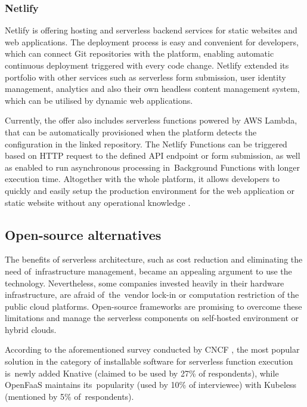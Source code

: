 \subsubsection{Netlify}

Netlify is offering hosting and serverless backend services for static websites and web applications. The deployment process is easy and convenient for developers, which can connect Git repositories with the platform, enabling automatic continuous deployment triggered with every code change. Netlify extended its portfolio with other services such as serverless form submission, user identity management, analytics and also their own headless content management system, which can be utilised by dynamic web applications.

Currently, the offer also includes serverless functions powered by AWS Lambda, that can be automatically provisioned when the platform detects the configuration in the linked repository. The Netlify Functions can be triggered based on HTTP request to the defined API endpoint or form submission, as well as enabled to run asynchronous processing in~Background Functions with longer execution time. Altogether with the whole platform, it allows developers to quickly and easily setup the production environment for the web application or static website without any operational knowledge \cite{NetlifyFunction}.

\subsection{Open-source alternatives}

The benefits of serverless architecture, such as cost reduction and eliminating the need of~infrastructure management, became an appealing argument to use the technology. Nevertheless, some companies invested heavily in their hardware infrastructure, are afraid of~the~vendor lock-in or computation restriction of the public cloud platforms. Open-source frameworks are promising to overcome these limitations and manage the serverless components on self-hosted environment or hybrid clouds.

According to the aforementioned survey conducted by CNCF \cite{CNCFServerlessSurvey2020}, the most popular solution in the category of installable software for serverless function execution is~newly added Knative (claimed to be used by 27\% of respondents), while OpenFaaS maintains its~popularity (used by 10\% of interviewee) with Kubeless (mentioned by 5\% of~respondents).

